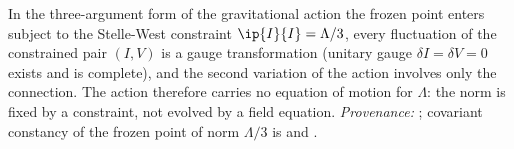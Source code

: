 In the three-argument form of the gravitational action the frozen point enters subject to the Stelle-West constraint $\ip{I}{I} = \Lambda/3$, every fluctuation of the constrained pair $(I, V)$ is a gauge transformation (unitary gauge $\delta I = \delta V = 0$ exists and is complete), and the second variation of the action involves only the connection. The action therefore carries no equation of motion for $\Lambda$: the norm is fixed by a constraint, not evolved by a field equation. \emph{Provenance:} \cite[Prop.~5.4]{ButlerT10}; covariant constancy of the frozen point of norm $\Lambda/3$ is \cite[Prop.~4.2(i)]{ButlerT10} and \cite[Thms.~4.5, 4.7]{ButlerT6}.
